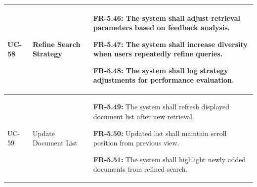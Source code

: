 \begin{longtable}{|>{\raggedright\arraybackslash}p{}|>{\raggedright\arraybackslash}p{}|>{\raggedright\arraybackslash}p{}|}
UC-58 & Refine Search Strategy &
\begin{frequirements}
\item \textbf{FR-5.46:} The system shall adjust retrieval parameters based on feedback analysis.
\item \textbf{FR-5.47:} The system shall increase diversity when users repeatedly refine queries.
\item \textbf{FR-5.48:} The system shall log strategy adjustments for performance evaluation.
\end{frequirements} \\
\hline

UC-59 & Update Document List &
\begin{frequirements}
\item \textbf{FR-5.49:} The system shall refresh displayed document list after new retrieval.
\item \textbf{FR-5.50:} Updated list shall maintain scroll position from previous view.
\item \textbf{FR-5.51:} The system shall highlight newly added documents from refined search.
\end{frequirements} \\
\hline

\end{longtable}
